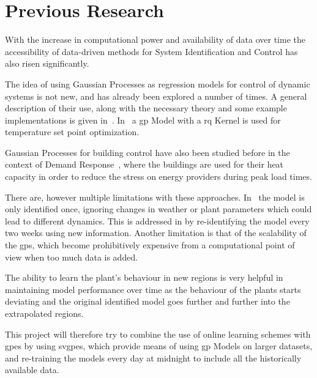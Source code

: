 \section{Previous Research}
With the increase in computational power and availability of data  over time the
accessibility of data-driven methods for System Identification and Control has
also risen significantly. 

The idea of using Gaussian Processes as regression models for control of dynamic
systems is not new, and has already been explored a number of times. A general
description of their use, along with the necessary theory and some example
implementations is given in~\cite{kocijanModellingControlDynamic2016}.
In~\cite{pleweSupervisoryModelPredictive2020} a \acrlong{gp} Model with a
\acrlong{rq} Kernel is used for temperature set point optimization.

Gaussian Processes for building control have also been studied before in the
context of Demand Response~\cite{nghiemDatadrivenDemandResponse2017,
jainLearningControlUsing2018}, where the buildings are used for their heat
capacity in order to reduce the stress on energy providers during peak load
times.

There are, however multiple limitations with these approaches. 
In~\cite{nghiemDatadrivenDemandResponse2017} the model is only identified once,
ignoring changes in weather or plant parameters which could lead to different
dynamics. This is addressed in \cite{jainLearningControlUsing2018} by
re-identifying the model every two weeks using new information. Another
limitation is that of the scalability of the \acrshort{gp}s, which become
prohibitively expensive from a computational point of view when too much data is
added.


The ability to learn the plant's behaviour in new regions is very helpful in
maintaining model performance over time as the behaviour of the plants starts
deviating and the original identified model goes further and further into the
extrapolated regions.


This project will therefore try to combine the use of online learning schemes
with \acrlong{gp}es by using \acrlong{svgp}es, which provide means of using
\acrshort{gp} Models on larger datasets, and re-training the models every day at
midnight to include all the historically available data.

\clearpage
